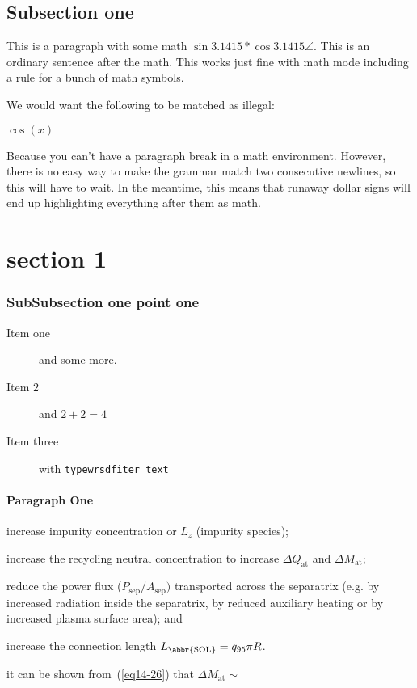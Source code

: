 \documentclass[letter]{article}
\begin{document}
\subsection{Subsection one}\label{sec:testLabel}
This is a paragraph with some math $ \sin{3.1415} * \cos{3.1415} \angle  $.  This is an ordinary sentence after the math.  This works just fine with math mode including a rule for a bunch of math symbols.

We would want the following to be matched as illegal:

$\cos(x)

$

Because you can't have a paragraph break in a math environment. However, there is no easy way to make the grammar match two consecutive newlines, so this will have to wait. In the meantime, this means that runaway dollar signs will end up highlighting everything after them as math.

\section[Optional title]{section 1}

\subsubsection{SubSubsection one point one}
\begin{description}
    \item[Item one]  and some more.
    \item[Item $2$] and $2+2 = 4$
    \item[Item three] with \texttt{typewrsdfiter text}
\end{description}

\paragraph{Paragraph One}

\begin{inparaenum}
  \item increase impurity concentration or $L_{z}$ (impurity species);
  \item increase the recycling neutral concentration to increase $\Delta Q_{\text{at}}$ and $\Delta M_{\text{at}}$; 
  \item reduce the power flux
    ($P_{\text{sep}} / A_{\text{sep}})$ transported across the separatrix
    (e.g.  by increased radiation inside the separatrix, by reduced auxiliary
    heating or by increased plasma surface area); and \item increase the
    connection length $L_{\text{\abbr{SOL}}} = q_{95}\pi R$.
\end{inparaenum}
it can be shown from~(\ref{eq14-26}) that $\Delta M_{\text{at}} \sim$
\end{document}
